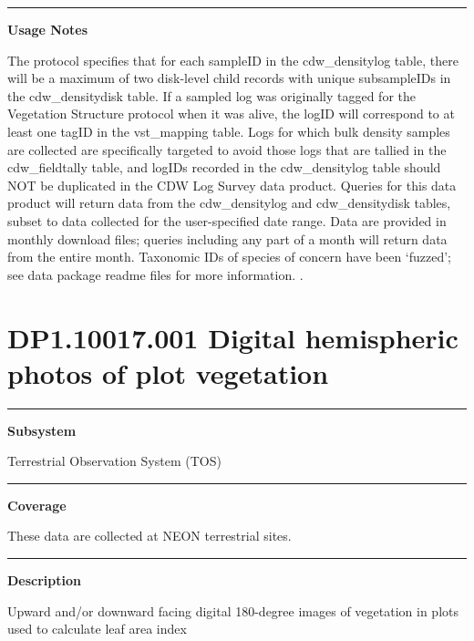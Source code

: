 \documentclass[]{article}
\begin{document}
\begin{center}\rule{0.5\linewidth}{\linethickness}\end{center}

\textbf{Usage Notes}

The protocol specifies that for each sampleID in the cdw\_densitylog
table, there will be a maximum of two disk-level child records with
unique subsampleIDs in the cdw\_densitydisk table. If a sampled log was
originally tagged for the Vegetation Structure protocol when it was
alive, the logID will correspond to at least one tagID in the
vst\_mapping table. Logs for which bulk density samples are collected
are specifically targeted to avoid those logs that are tallied in the
cdw\_fieldtally table, and logIDs recorded in the cdw\_densitylog table
should NOT be duplicated in the CDW Log Survey data product. Queries for
this data product will return data from the cdw\_densitylog and
cdw\_densitydisk tables, subset to data collected for the user-specified
date range. Data are provided in monthly download files; queries
including any part of a month will return data from the entire month.
Taxonomic IDs of species of concern have been `fuzzed'; see data package
readme files for more information. \newpage
.

\section{DP1.10017.001 Digital hemispheric photos of plot
vegetation}\label{dp1.10017.001-digital-hemispheric-photos-of-plot-vegetation}

\begin{center}\rule{0.5\linewidth}{\linethickness}\end{center}

\textbf{Subsystem}

Terrestrial Observation System (TOS)

\begin{center}\rule{0.5\linewidth}{\linethickness}\end{center}

\textbf{Coverage}

These data are collected at NEON terrestrial sites.

\begin{center}\rule{0.5\linewidth}{\linethickness}\end{center}

\textbf{Description}

Upward and/or downward facing digital 180-degree images of vegetation in
plots used to calculate leaf area index
\end{document}
